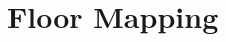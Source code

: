 \documentclass[class=article, crop=false]{standalone}
\begin{document}
\pgfplotsset{width=14cm,compat=1.9}
\section{Floor Mapping}\label{sec:floor}
\end{document}
